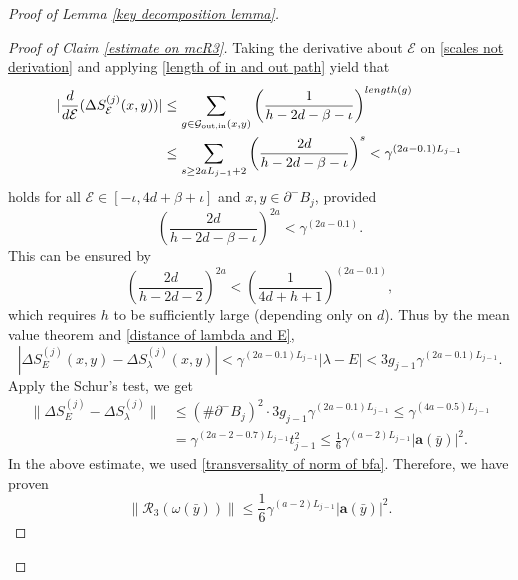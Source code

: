 \documentclass[10pt,a4paper]{amsart}
\newcommand{\bfa}{\mathbf{a}}
\newcommand{\diffSj}{\Delta {S}^{(j)}}
\newcommand{\length}{{\rm length}}
\newcommand{\mcE}{\mathcal{E}}
\newcommand{\mcG}{\mathcal{G}}
\newcommand{\mcR}{\mathcal{R}}
\begin{document}
\begin{proof}[Proof of Lemma \ref{key decomposition lemma}]
\begin{proof}[Proof of Claim \ref{estimate on mcR3}]
Taking the  derivative  about $\mcE$ on \eqref{scales not derivation} and applying \eqref{length of in and out path} yield  that 
\begin{align*}
  |\frac{d}{d \mcE} (\diffSj_{\mcE}(x,y))| & \leq \sum_{g\in \mcG_{\text{out,in}}(x,y) } \left(\frac{1}{h-2d-\beta-\iota}\right) ^{\length(g)} \\
     &\leq \sum_{s\geq 2aL_{j-1}+2}  \left(\frac{2d}{h-2d-\beta-\iota}\right) ^s <\gamma^{(2a-0.1)L_{j-1}}
\end{align*}
holds for all $\mcE\in [-\iota,4d+\beta+\iota]$ and $x,y\in \partial^-B_j$,  provided 
\[ \left(\frac{2d}{h-2d-\beta-\iota}\right)^{2a}< \gamma^{(2a-0.1)}. \]
This can be ensured by 
\begin{equation}\label{essential barrier high 4}
  \left(\frac{2d}{h-2d-2}\right)^{2a}< \left(\frac{1}{4d+h+1}\right)^{(2a-0.1)},
\end{equation}
which requires $h$ to be sufficiently large (depending only on $d$). Thus by the mean value theorem and \eqref{distance of lambda and E},  
\[ |\diffSj_{E}(x,y)-\diffSj_{\lambda}(x,y)| < \gamma^{(2a-0.1)L_{j-1}} |\lambda-E| < 3 g_{j-1} \gamma^{(2a-0.1)L_{j-1}} .\]
Apply the Schur's  test, we get  
\begin{align*}
  \| \diffSj_E-\diffSj_{\lambda}  \|& \leq (\# \partial^-B_j)^2 \cdot 3 g_{j-1} \gamma^{(2a-0.1)L_{j-1}} \leq   \gamma^{(4a-0.5)L_{j-1}} \\
     & = \gamma^{(2a-2-0.7)L_{j-1}} t^2_{j-1} \leq \frac{1}{6} \gamma^{(a-2)L_{j-1}} |\bfa(\bar{y})|^2.
\end{align*}
In the above estimate, we used \eqref{transversality of norm of bfa}. Therefore, we  have proven   
\begin{equation}\label{bound on first part of mcR3}
  \|\mcR_3(\omega(\bar{y})) \| \leq \frac{1}{6}\gamma^{(a-2)L_{j-1}} |\bfa(\bar{y})|^2.
\end{equation}
\end{proof}



\end{proof}
\end{document}
